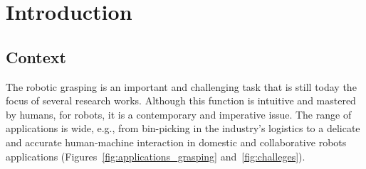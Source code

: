 \chapter{Introduction}
\label{Ch:Introducao}

\section{Context}

\sloppy %
The robotic grasping is an important and challenging task that is still today the focus of several research works. Although this function is intuitive and mastered by humans, for robots, it is a contemporary and imperative issue. The range of applications is wide, e.g., from bin-picking in the industry's logistics to a delicate and accurate human-machine interaction in domestic and collaborative robots applications (Figures~\ref{fig:applications_grasping} and~\ref{fig:challeges}).


